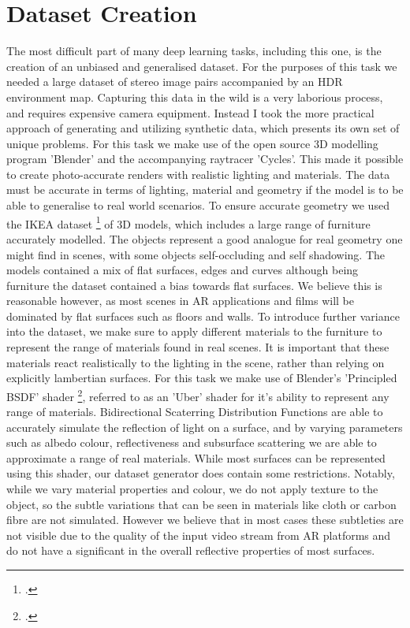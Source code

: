 \documentclass[ %
                    author={Gavin Parker},
                supervisor={Dr. Neill Campbell},
                    degree={MEng},
                     title={Deep Siamese Networks for Illumination Estimation from Stereo Images},
                  subtitle={},
                      type={research},
                      year={2018} ]{dissertation}
\begin{document}
\section{Dataset Creation}
The most difficult part of many deep learning tasks, including this one, is the creation of an unbiased and generalised dataset. For the purposes of this task we needed a large dataset of stereo image pairs accompanied by an HDR environment map. Capturing this data in the wild is a very laborious process, and requires expensive camera equipment. Instead I took the more practical approach of generating and utilizing synthetic data, which presents its own set of unique problems. For this task we make use of the open source 3D modelling program 'Blender' and the accompanying raytracer 'Cycles'. This made it possible to create photo-accurate renders with realistic lighting and materials. The data must be accurate in terms of lighting, material and geometry if the model is to be able to generalise to real world scenarios. To ensure accurate geometry we used the IKEA dataset \footcite{http://ikea.csail.mit.edu/} of 3D models, which includes a large range of furniture accurately modelled. The objects represent a good analogue for real geometry one might find in scenes, with some objects self-occluding and self shadowing. The models contained a mix of flat surfaces, edges and curves although being furniture the dataset contained a bias towards flat surfaces. We believe this is reasonable however, as most scenes in AR applications and films will be dominated by flat surfaces such as floors and walls.
\newline
To introduce further variance into the dataset, we make sure to apply different materials to the furniture to represent the range of materials found in real scenes. It is important that these materials react realistically to the lighting in the scene, rather than relying on explicitly lambertian surfaces. For this task we make use of Blender's 'Principled BSDF' shader \footcite{https://docs.blender.org/manual/en/dev/render/cycles/nodes/types/shaders/principled.html}, referred to as an 'Uber' shader for it's ability to represent any range of materials. Bidirectional Scaterring Distribution Functions are able to accurately simulate the reflection of light on a surface, and by varying parameters such as albedo colour, reflectiveness and subsurface scattering we are able to approximate a range of real materials. While most surfaces can be represented using this shader, our dataset generator does contain some restrictions. Notably, while we vary material properties and colour, we do not apply texture to the object, so the subtle variations that can be seen in materials like cloth or carbon fibre are not simulated. However we believe that in most cases these subtleties are not visible due to the quality of the input video stream from AR platforms and do not have a significant in the overall reflective properties of most surfaces.
\end{document}
